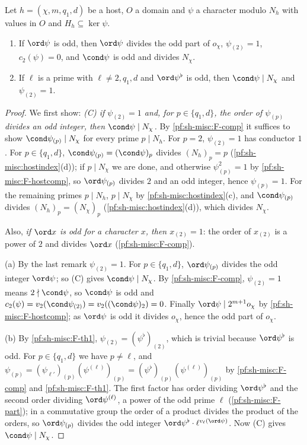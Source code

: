 \begin{lemma}\label{pf:sh-misc:hostodd}
Let $h=(\chi,m,q_1,d)$ be a host, $O$ a domain and $\psi$ a character modulo $N_h$ with values in $O$ and $H_h\subseteq\ker\psi$.
\begin{enumerate}[label=(\alph*)]
\item If $\ord\psi$ is odd, then $\ord\psi$ divides the odd part of $o_\chi$, $\psi_{(2)}=1$, $c_2(\psi)=0$, and $\cond\psi$ is odd and
divides $N_\chi$.
\item If $\ell$ is a prime with $\ell\ne2,q_1,d$ and $\ord\psi^\flat$ is odd, then $\cond\psi\mid N_\chi$ and $\psi_{(2)}=1$.
\end{enumerate}
\end{lemma}

\begin{proof}
We first show: \emph{(C) if $\psi_{(2)}=1$ and, for $p\in\{q_1,d\}$, the order of $\psi_{(p)}$ divides an odd integer, then $\cond\psi\mid
N_\chi$.} By \ref{pf:sh-misc:F-comp} it suffices to show $\cond\psi_{(p)}\mid N_\chi$ for every prime $p\mid N_h$. For $p=2$,
$\psi_{(2)}=1$ has conductor $1$. For $p\in\{q_1,d\}$, $\cond\psi_{(p)}=(\cond\psi)_p$ divides $(N_h)_p=p$
(\cref{pf:sh-misc:hostindex}(d)); if $p\mid N_\chi$ we are done, and otherwise $\psi_{(p)}^2=1$ by \ref{pf:sh-misc:F-hostcomp},
so $\ord\psi_{(p)}$ divides $2$ and an odd integer, hence $\psi_{(p)}=1$. For the remaining primes $p\mid N_h$, $p\mid N_\chi$ by
\cref{pf:sh-misc:hostindex}(c), and $\cond\psi_{(p)}$ divides $(N_h)_p=(N_\chi)_p$ (\cref{pf:sh-misc:hostindex}(d)), which divides
$N_\chi$.

Also, \emph{if $\ord x$ is odd for a character $x$, then $x_{(2)}=1$}: the order of $x_{(2)}$ is a power of $2$ and divides $\ord x$
(\ref{pf:sh-misc:F-comp}).

(a) By the last remark $\psi_{(2)}=1$. For $p\in\{q_1,d\}$, $\ord\psi_{(p)}$ divides the odd integer $\ord\psi$; so (C) gives
$\cond\psi\mid N_\chi$. By \ref{pf:sh-misc:F-comp}, $\psi_{(2)}=1$ means $2\nmid\cond\psi$, so $\cond\psi$ is odd and
$c_2(\psi)=v_2(\cond\psi_{(2)})=v_2((\cond\psi)_2)=0$. Finally $\ord\psi\mid2^{m+1}o_\chi$ by \ref{pf:sh-misc:F-hostcomp}; as
$\ord\psi$ is odd it divides $o_\chi$, hence the odd part of $o_\chi$.

(b) By \ref{pf:sh-misc:F-th1}, $\psi_{(2)}=(\psi^\flat)_{(2)}$, which is trivial because $\ord\psi^\flat$ is odd. For $p\in\{q_1,d\}$ we
have $p\ne\ell$, and $\psi_{(p)}=(\psi_{\ell'})_{(p)}(\psi^{(\ell)})_{(p)}=(\psi^\flat)_{(p)}(\psi^{(\ell)})_{(p)}$ by
\ref{pf:sh-misc:F-comp} and \ref{pf:sh-misc:F-th1}. The first factor has order dividing $\ord\psi^\flat$ and the second order dividing
$\ord\psi^{(\ell)}$, a power of the odd prime $\ell$ (\ref{pf:sh-misc:F-part}); in a commutative group the order of a product divides the
product of the orders, so $\ord\psi_{(p)}$ divides the odd integer $\ord\psi^\flat\cdot\ell^{v_\ell(\ord\psi)}$. Now (C) gives
$\cond\psi\mid N_\chi$.
\end{proof}

